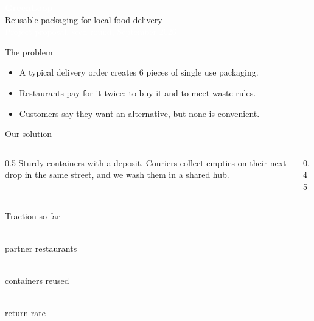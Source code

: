 \documentclass[aspectratio=169]{beamer}
\newcommand{\bigstat}[2]{\begin{minipage}{0.3\textwidth}\centering{\fontsize{34}{38}\selectfont\bfseries\textcolor{accent}{#1}}\\[0.3em]#2\end{minipage}}
\begin{document}
{
\begin{frame}[plain]
  \vfill
  {\fontsize{40}{44}\selectfont\bfseries\textcolor{white}{GreenLoop}}\\[0.6em]
  {\Large\textcolor{accent}{Reusable packaging for local food delivery}}\\[2em]
  \textcolor{white}{Project proposal, seed round, September 2026}
  \vfill
\end{frame}
}

\begin{frame}{The problem}
  \begin{itemize}
    \item A typical delivery order creates 6 pieces of single use packaging.
    \item Restaurants pay for it twice: to buy it and to meet waste rules.
    \item Customers say they want an alternative, but none is convenient.
  \end{itemize}
\end{frame}

\begin{frame}{Our solution}
  \begin{columns}[c]
    \begin{column}{0.5\textwidth}
      Sturdy containers with a deposit. Couriers collect empties on their next drop in the same street, and we wash them in a shared hub.
    \end{column}
    \begin{column}{0.45\textwidth}
      \centering
    \end{column}
  \end{columns}
\end{frame}

\begin{frame}{Traction so far}
  \vspace{1em}
  \centering
  \bigstat{22}{partner restaurants}\hfill
  \bigstat{9{,}400}{containers reused}\hfill
  \bigstat{93\%}{return rate}
\end{frame}
\end{document}
